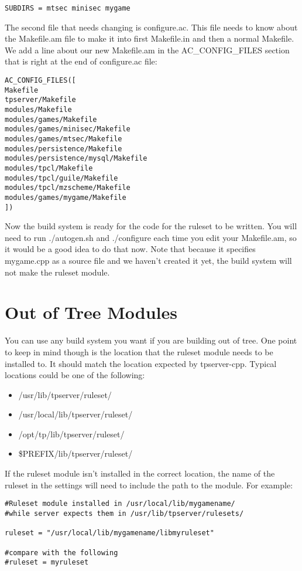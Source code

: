 \documentclass[a4paper,11pt]{report}
\begin{document}
\begin{verbatim}
SUBDIRS = mtsec minisec mygame
\end{verbatim}

The second file that needs changing is configure.ac. This file needs to know about the Makefile.am file to make it into first Makefile.in and then a normal Makefile. We add a line about our new Makefile.am in the AC\_CONFIG\_FILES section that is right at the end of configure.ac file:

\begin{verbatim}
AC_CONFIG_FILES([
Makefile
tpserver/Makefile
modules/Makefile
modules/games/Makefile
modules/games/minisec/Makefile
modules/games/mtsec/Makefile
modules/persistence/Makefile
modules/persistence/mysql/Makefile
modules/tpcl/Makefile
modules/tpcl/guile/Makefile
modules/tpcl/mzscheme/Makefile
modules/games/mygame/Makefile
]) 
\end{verbatim}

Now the build system is ready for the code for the ruleset to be written. You will need to run ./autogen.sh and ./configure each time you edit your Makefile.am, so it would be a good idea to do that now. Note that because it specifies mygame.cpp as a source file and we haven't created it yet, the build system will not make the ruleset module.

\section{Out of Tree Modules}
\label{sec:outoftree-module-build}

You can use any build system you want if you are building out of tree. One point to keep in mind though is the location that the ruleset module needs to be installed to. It should match the location expected by tpserver-cpp. Typical locations could be one of the following:
\begin{itemize}
 \item /usr/lib/tpserver/ruleset/
 \item /usr/local/lib/tpserver/ruleset/
 \item /opt/tp/lib/tpserver/ruleset/
 \item \$PREFIX/lib/tpserver/ruleset/
\end{itemize}

If the ruleset module isn't installed in the correct location, the name of the ruleset in the settings will need to include the path to the module. For example:

\begin{verbatim}
#Ruleset module installed in /usr/local/lib/mygamename/
#while server expects them in /usr/lib/tpserver/rulesets/

ruleset = "/usr/local/lib/mygamename/libmyruleset"

#compare with the following
#ruleset = myruleset
\end{verbatim}
\end{document}

